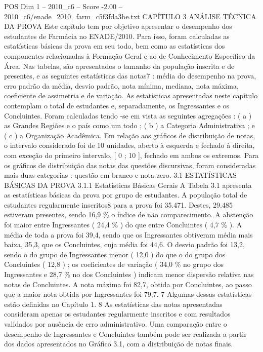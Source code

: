\begin{textsample}{POS Dim 1 – 2010\_c6 – Score -2.00 – 2010\_c6/enade\_2010\_farm\_c5f3fda3be.txt}  \label{ex:f1_pos_169}
CAPÍTULO 3 ANÁLISE TÉCNICA DA PROVA Este capítulo tem por objetivo apresentar o desempenho dos estudantes de Farmácia no ENADE/2010.
Para isso, foram calculadas as estatísticas básicas da prova em seu todo, bem como as estatísticas dos componentes relacionadas à Formação Geral e ao de Conhecimento Específico da Área.
Nas tabelas, são apresentados o tamanho da população inscrita e de presentes, e as seguintes estatísticas das notas7 : média do desempenho na prova, erro padrão da média, desvio padrão, nota mínima, mediana, nota máxima, coeficiente de assimetria e de variação.
As estatísticas apresentadas neste capítulo contemplam o total de estudantes e, separadamente, os Ingressantes e os Concluintes.
Foram calculadas tendo -se em vista as seguintes agregações : ( a ) as Grandes Regiões e o país como um todo ; ( b ) a Categoria Administrativa ; e ( c ) a Organização Acadêmica.
Em relação aos gráficos de distribuição de notas, o intervalo considerado foi de 10 unidades, aberto à esquerda e fechado à direita, com exceção do primeiro intervalo, [ 0 ; 10 ], fechado em ambos os extremos.
Para os gráficos de distribuição das notas das questões discursivas, foram consideradas mais duas categorias : questão em branco e nota zero. 3.1 ESTATÍSTICAS BÁSICAS DA PROVA 3.1.1 Estatísticas Básicas Gerais A Tabela 3.1 apresenta as estatísticas básicas da prova por grupo de estudantes.
A população total de estudantes regularmente inscritos8 para a prova foi 35.471.
Destes, 29.485 estiveram presentes, sendo 16,9 \% o índice de não comparecimento.
A abstenção foi maior entre Ingressantes ( 24,4 \% ) do que entre Concluintes ( 4,7 \% ).
A média de toda a prova foi 39,4, sendo que os Ingressantes obtiveram média mais baixa, 35,3, que os Concluintes, cuja média foi 44,6.
O desvio padrão foi 13,2, sendo o do grupo de Ingressantes menor ( 12,0 ) do que o do grupo dos Concluintes ( 12,8 ) ; os coeficientes de variação ( 34,0 \% no grupo dos Ingressantes e 28,7 \% no dos Concluintes ) indicam menor dispersão relativa nas notas de Concluintes.
A nota máxima foi 82,7, obtida por Concluintes, ao passo que a maior nota obtida por Ingressantes foi 79,7. 7 Algumas dessas estatísticas estão definidas no Capítulo 1. 8 As estatísticas das notas apresentadas consideram apenas os estudantes regularmente inscritos e com resultados validados por ausência de erro administrativo.
Uma comparação entre o desempenho de Ingressantes e Concluintes também pode ser realizada a partir dos dados apresentados no Gráfico 3.1, com a distribuição de notas finais.

\end{textsample}
